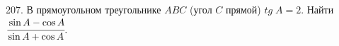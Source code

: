 207. В прямоугольном треугольнике $ABC$ (угол $C$ прямой) $tg\; A=2.$ Найти $\cfrac{\sin A -\cos A}{\sin A +\cos A}.$\\
